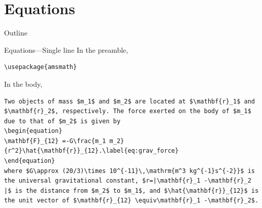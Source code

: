\documentclass[12pt]{gshs_lecture}
\begin{document}
\section{Equations} %

\begin{frame}[t]{Outline}
\tableofcontents[currentsection]
\end{frame}

\begin{frame}[t,fragile]{Equations---Single line}\small
In the preamble,
\begin{block}{}
\begin{lstlisting}
\usepackage{amsmath}
\end{lstlisting}
\end{block}
In the body,
\begin{block}{}
\begin{lstlisting}
Two objects of mass $m_1$ and $m_2$ are located at $\mathbf{r}_1$ and $\mathbf{r}_2$, respectively. The force exerted on the body of $m_1$ due to that of $m_2$ is given by
\begin{equation}
\mathbf{F}_{12} =-G\frac{m_1 m_2}{r^2}\hat{\mathbf{r}}_{12}.\label{eq:grav_force}
\end{equation}
where $G\approx (20/3)\times 10^{-11}\,\mathrm{m^3 kg^{-1}s^{-2}}$ is the universal gravitational constant, $r=|\mathbf{r}_1 -\mathbf{r}_2 |$ is the distance from $m_2$ to $m_1$, and $\hat{\mathbf{r}}_{12}$ is the unit vector of $\mathbf{r}_{12} \equiv\mathbf{r}_1 -\mathbf{r}_2$.
\end{lstlisting}
\end{block}
\end{frame}
\end{document}
